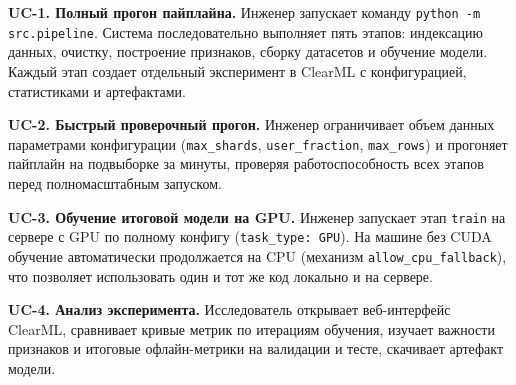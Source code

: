 \textbf{UC-1. Полный прогон пайплайна.}
Инженер запускает команду \texttt{python -m src.pipeline}.
Система последовательно выполняет пять этапов: индексацию данных, очистку, построение признаков, сборку датасетов и обучение модели.
Каждый этап создает отдельный эксперимент в ClearML с конфигурацией, статистиками и артефактами.

\textbf{UC-2. Быстрый проверочный прогон.}
Инженер ограничивает объем данных параметрами конфигурации (\texttt{max\_shards}, \texttt{user\_fraction}, \texttt{max\_rows}) и прогоняет пайплайн на подвыборке за минуты, проверяя работоспособность всех этапов перед полномасштабным запуском.

\textbf{UC-3. Обучение итоговой модели на GPU.}
Инженер запускает этап \texttt{train} на сервере с GPU по полному конфигу (\texttt{task\_type: GPU}).
На машине без CUDA обучение автоматически продолжается на CPU (механизм \texttt{allow\_cpu\_fallback}), что позволяет использовать один и тот же код локально и на сервере.

\textbf{UC-4. Анализ эксперимента.}
Исследователь открывает веб-интерфейс ClearML, сравнивает кривые метрик по итерациям обучения, изучает важности признаков и итоговые офлайн-метрики на валидации и тесте, скачивает артефакт модели.
